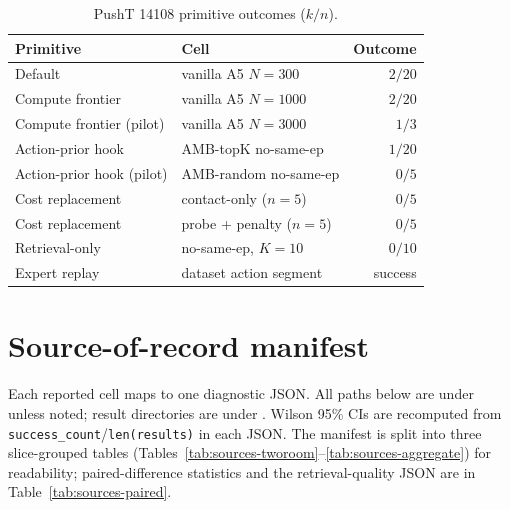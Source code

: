 \documentclass{article}
\begin{document}
\begin{table}[ht]
\centering\small
\caption{PushT 14108 primitive outcomes ($k/n$).}
\label{tab:slice-pusht14108}
\begin{tabular}{llr}
\toprule
Primitive & Cell & Outcome \\
\midrule
Default                  & vanilla A5 $N{=}300$        & $2/20$ \\
Compute frontier         & vanilla A5 $N{=}1000$       & $2/20$ \\
Compute frontier (pilot) & vanilla A5 $N{=}3000$       & $1/3$ \\
Action-prior hook        & AMB-topK no-same-ep         & $1/20$ \\
Action-prior hook (pilot)& AMB-random no-same-ep        & $0/5$ \\
Cost replacement         & contact-only ($n{=}5$)        & $0/5$ \\
Cost replacement         & probe + penalty ($n{=}5$)     & $0/5$ \\
Retrieval-only           & no-same-ep, $K{=}10$         & $0/10$ \\
Expert replay            & dataset action segment       & success \\
\bottomrule
\end{tabular}
\end{table}

\section{Source-of-record manifest}
\label{app:sources}

Each reported cell maps to one diagnostic JSON. All paths below are under  unless noted; result directories are under . Wilson 95\% CIs are recomputed from \texttt{success\_count}/\texttt{len(results)} in each JSON. The manifest is split into three slice-grouped tables (Tables~\ref{tab:sources-tworoom}--\ref{tab:sources-aggregate}) for readability; paired-difference statistics and the retrieval-quality JSON are in Table~\ref{tab:sources-paired}.
\end{document}
